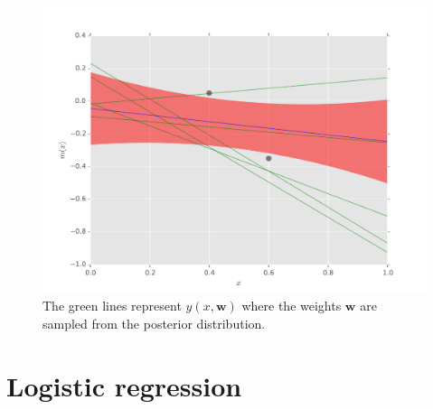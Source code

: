 \documentclass[paper=a4, fontsize=10pt]{scrartcl} %
\numberwithin{equation}{section} %
\numberwithin{figure}{section} %
\numberwithin{table}{section} %
\begin{document}
\begin{enumerate}
	\begin{figure}[H]
			\centering
			\includegraphics[scale=0.65]{exercise_13.pdf}
			\caption{The green lines represent $y(x, \boldsymbol w)$ where the weights $\boldsymbol w$ are sampled from the posterior distribution.}
			\label{sampled}
		  \end{figure}
\end{enumerate}

\section{Logistic regression}
\end{document}
